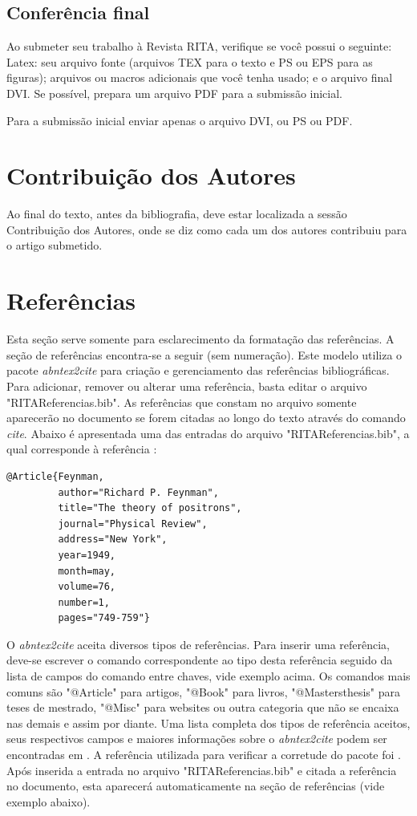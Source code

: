\documentclass{RITA}
\begin{document}
\subsection{Conferência final}
Ao submeter seu trabalho à Revista RITA, verifique se você possui o seguinte:
Latex: seu arquivo fonte (arquivos TEX para o texto e PS ou EPS para as figuras); arquivos ou macros adicionais que você tenha usado; e o arquivo final DVI. Se possível, prepara um arquivo PDF para a submissão inicial.

Para a submissão inicial enviar apenas o arquivo DVI, ou PS ou PDF.

\section{Contribuição dos Autores}
Ao final do texto, antes da bibliografia, deve estar localizada a sessão Contribuição dos Autores, onde se diz como cada um dos autores contribuiu para o artigo submetido.

\section{Referências}
Esta seção serve somente para esclarecimento da formatação das referências. A seção de referências encontra-se a seguir (sem numeração). Este modelo utiliza o pacote \textit{abntex2cite} para criação e gerenciamento das referências bibliográficas. Para adicionar, remover ou alterar uma referência, basta editar o arquivo "RITAReferencias.bib". As referências que constam no arquivo somente aparecerão no documento se forem citadas ao longo do texto através do comando \textit{cite}. Abaixo é apresentada uma das entradas do arquivo "RITAReferencias.bib", a qual corresponde à referência \cite{Feynman}:

\begin{verbatim}
@Article{Feynman,
         author="Richard P. Feynman", 
         title="The theory of positrons",
         journal="Physical Review",
         address="New York",
         year=1949,
         month=may,
         volume=76,
         number=1,
         pages="749-759"}
\end{verbatim}

O \textit{abntex2cite} aceita diversos tipos de referências. Para inserir uma referência, deve-se escrever o comando correspondente ao tipo desta referência seguido da lista de campos do comando entre chaves, vide exemplo acima. Os comandos mais comuns são "@Article" para artigos, "@Book" para livros, "@Mastersthesis" para teses de mestrado, "@Misc" para websites ou outra categoria que não se encaixa nas demais e assim por diante. Uma lista completa dos tipos de referência aceitos, seus respectivos campos e maiores informações sobre o \textit{abntex2cite} podem ser encontradas em \cite{abntexcite}. A referência utilizada para verificar a corretude do pacote foi \cite{normasABNT}. Após inserida a entrada no arquivo "RITAReferencias.bib" e citada a referência no documento, esta aparecerá automaticamente na seção de referências (vide exemplo abaixo).

\setcounter{secnumdepth}{0}

\end{document}
